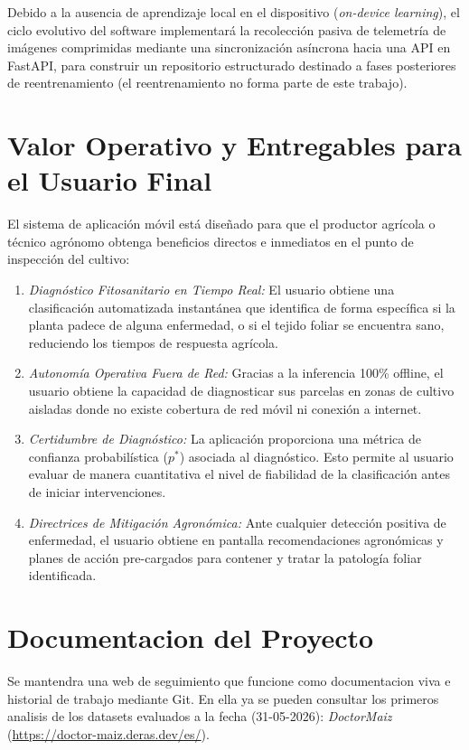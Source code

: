 \documentclass[10pt,journal,compsoc]{IEEEtran} %
\begin{document}
Debido a la ausencia de aprendizaje local en el dispositivo (\textit{on-device learning}), el ciclo evolutivo del software implementará la recolección pasiva de telemetría de imágenes comprimidas mediante una sincronización asíncrona hacia una API en FastAPI, para construir un repositorio estructurado destinado a fases posteriores de reentrenamiento (el reentrenamiento no forma parte de este trabajo).

\section{Valor Operativo y Entregables para el Usuario Final}
El sistema de aplicación móvil está diseñado para que el productor agrícola o técnico agrónomo obtenga beneficios directos e inmediatos en el punto de inspección del cultivo:
\begin{enumerate}
    \item \textit{Diagnóstico Fitosanitario en Tiempo Real:} El usuario obtiene una clasificación automatizada instantánea que identifica de forma específica si la planta padece de alguna enfermedad, o si el tejido foliar se encuentra sano, reduciendo los tiempos de respuesta agrícola.
    \item \textit{Autonomía Operativa Fuera de Red:} Gracias a la inferencia 100\% offline, el usuario obtiene la capacidad de diagnosticar sus parcelas en zonas de cultivo aisladas donde no existe cobertura de red móvil ni conexión a internet.
    \item \textit{Certidumbre de Diagnóstico:} La aplicación proporciona una métrica de confianza probabilística ($p^*$) asociada al diagnóstico. Esto permite al usuario evaluar de manera cuantitativa el nivel de fiabilidad de la clasificación antes de iniciar intervenciones.
    \item \textit{Directrices de Mitigación Agronómica:} Ante cualquier detección positiva de enfermedad, el usuario obtiene en pantalla recomendaciones agronómicas y planes de acción pre-cargados para contener y tratar la patología foliar identificada.
\end{enumerate}

\section{Documentacion del Proyecto}
Se mantendra una web de seguimiento que funcione como documentacion viva e historial de trabajo mediante Git. En ella ya se pueden consultar los primeros analisis de los datasets evaluados a la fecha (31-05-2026): \textit{DoctorMaiz} (\url{https://doctor-maiz.deras.dev/es/}).
\end{document}
